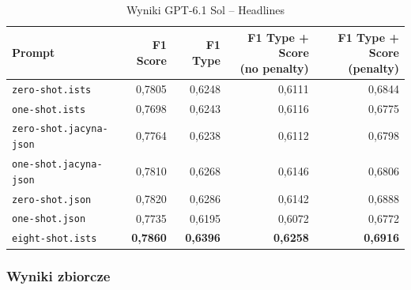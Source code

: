 \documentclass[a4paper,10pt]{article}
\begin{document}
\begin{table}[htbp]
    \centering
    \small
    \caption{Wyniki GPT-6.1 Sol -- Headlines}
    \label{tab:sol_headlines}
    \begin{tabular}{lrrrr}
        \toprule
        Prompt
        & F1 Score
        & F1 Type
        & \shortstack{F1 Type + Score\\(no penalty)}
        & \shortstack{F1 Type + Score\\(penalty)} \\
        \midrule
        \texttt{zero-shot.ists}
            & 0,7805 & 0,6248 & 0,6111 & 0,6844 \\
        \texttt{one-shot.ists}
            & 0,7698 & 0,6243 & 0,6116 & 0,6775 \\
        \texttt{zero-shot.jacyna-json}
            & 0,7764 & 0,6238 & 0,6112 & 0,6798 \\
        \texttt{one-shot.jacyna-json}
            & 0,7810 & 0,6268 & 0,6146 & 0,6806 \\
        \texttt{zero-shot.json}
            & 0,7820 & 0,6286 & 0,6142 & 0,6888 \\
        \texttt{one-shot.json}
            & 0,7735 & 0,6195 & 0,6072 & 0,6772 \\
        \texttt{eight-shot.ists}
            & \textbf{0,7860}
            & \textbf{0,6396}
            & \textbf{0,6258}
            & \textbf{0,6916} \\
        \bottomrule
    \end{tabular}
\end{table}


\subsubsection{Wyniki zbiorcze}
\end{document}

